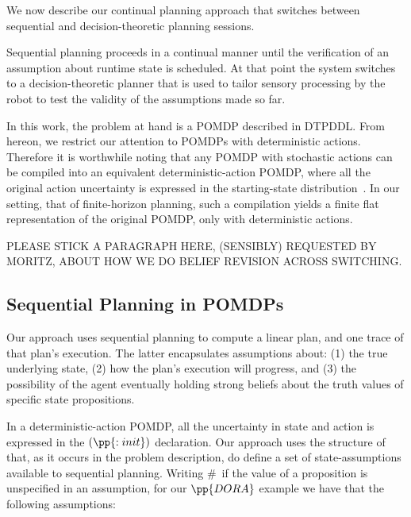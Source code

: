 

We now describe our continual planning approach that switches between
sequential and decision-theoretic planning sessions. 

Sequential planning proceeds in a continual manner until the
verification of an assumption about runtime state is scheduled. At
that point the system switches to a decision-theoretic planner that is
used to tailor sensory processing by the robot to test the validity of
the assumptions made so far.

In this work, the problem at hand is a POMDP described in DTPDDL. From
hereon, we restrict our attention to POMDPs with deterministic
actions. Therefore it is worthwhile noting that any POMDP with
stochastic actions can be compiled into an equivalent
deterministic-action POMDP, where all the original action uncertainty
is expressed in the starting-state
distribution~\cite{ng:Jordan:2000}. In our setting, that of
finite-horizon planning, such a compilation yields a finite flat
representation of the original POMDP, only with deterministic
actions. 


PLEASE STICK A PARAGRAPH HERE, (SENSIBLY) REQUESTED BY MORITZ, ABOUT
HOW WE DO BELIEF REVISION ACROSS SWITCHING.


\subsection{Sequential Planning in POMDPs}


Our approach uses sequential planning to compute a linear plan, and
one trace of that plan's execution. The latter encapsulates
assumptions about: (1) the true underlying state, (2) how the plan's
execution will progress, and (3) the possibility of the agent
eventually holding strong beliefs about the truth values of specific
state propositions.

In a deterministic-action POMDP, all the uncertainty in state and
action is expressed in the $(\pp{:init})$ declaration. Our approach
uses the structure of that, as it occurs in the problem description,
do define a set of state-assumptions available to sequential planning.
Writing \#\ if the value of a proposition is unspecified in an
assumption, for our $\pp{DORA}$ example we have that the following
assumptions:

